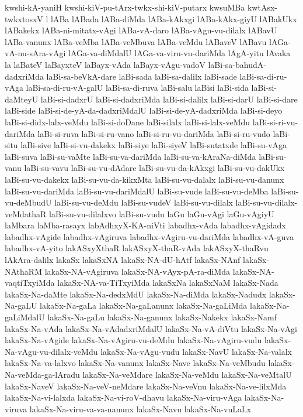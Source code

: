 {kwshi-kA-yaniH
kwshi-kiV-pu-tArx-twkx-shi-kiV-putarx
kwsuMBa
kwtAsx-twkxtosxV
l
lABa
lABada
lABa-diMda
lABa-kAkxgi
lABa-kAkx-giyU
lABakUkx
lABakekx
lABa-ni-mitatx-vAgi
lABa-vA-daro
lABa-vAgu-vu-dilalx
lABavU
lABa-vanunx
lABa-veMba
lABa-veMbuva
lABa-veMdu
lABaveV
lABavu
lAGa-vA-nu-sAra-vAgi
lAGa-va-diMdalU
lAGa-va-viru-vu-dariMda
lAgA-yitu
lAvaka
la
laBateV
laBayxteV
laBayx-vAda
laBayx-vAgu-vadoV
laBi-sa-bahudA-dadxriMda
laBi-sa-beVkA-dare
laBi-sada
laBi-sa-dalilx
laBi-sade
laBi-sa-di-ru-vAga
laBi-sa-di-ru-vA-galU
laBi-sa-di-ruva
laBi-salu
laBisi
laBi-sida
laBi-si-daMteyU
laBi-si-dadxrU
laBi-si-dadxriMda
laBi-si-dalilx
laBi-si-darU
laBi-si-dare
laBi-side
laBi-si-de-yA-da-dadxriMdalU
laBi-si-de-yA-dadxriMda
laBi-si-deyo
laBi-si-didx-lalx-veMdu
laBi-si-doDane
laBi-silalx
laBi-si-lalx-veMdu
laBi-si-ri-vu-dariMda
laBi-si-ruva
laBi-si-ru-vano
laBi-si-ru-vu-dariMda
laBi-si-ru-vudo
laBi-situ
laBi-sive
laBi-si-vu-dakekx
laBi-siye
laBi-siyeV
laBi-sutatxde
laBi-su-vAga
laBi-suva
laBi-su-vaMte
laBi-su-va-dariMda
laBi-su-va-kAraNa-diMda
laBi-su-vanu
laBi-su-vavu
laBi-su-vu-dAdare
laBi-su-vu-da-kAkxgi
laBi-su-vu-dakUkx
laBi-su-vu-dakekx
laBi-su-vu-da-kikxMta
laBi-su-vu-dalalx
laBi-su-vu-danunx
laBi-su-vu-dariMda
laBi-su-vu-dariMdalU
laBi-su-vude
laBi-su-vu-deMba
laBi-su-vu-deMbudU
laBi-su-vu-deMdu
laBi-su-vudeV
laBi-su-vu-dilalx
laBi-su-vu-dilalx-veMdathaR
laBi-su-vu-dilalxvo
laBi-su-vudu
laGu
laGu-vAgi
laGu-vAgiyU
laMbara
laMba-rasayx
labAdhxyX-KA-niVti
labadhx-vAda
labadhx-vAgidadx
labadhx-vAgide
labadhx-vAgiruva
labadhx-vAgiru-vu-dariMda
labadhx-vA-guva
labadhx-vA-yito
lakASxyXthaR
lakASxyX-thaR-vAda
lakASxyX-thaRvu
lAkAra-dalilx
lakaSx
lakaSxNA
lakaSx-NA-dU-hAtf
lakaSx-NAnf
lakaSx-NAthaRM
lakaSx-NA-vAgiruva
lakaSx-NA-vAyx-pA-ra-diMda
lakaSx-NA-vaqtiTxyiMda
lakaSx-NA-va-TiTxyiMda
lakaSxNa
lakaSxNaM
lakaSx-Nada
lakaSx-Na-daMte
lakaSx-Na-dedxMdU
lakaSx-Na-diMda
lakaSx-Nadudx
lakaSx-Na-gaLU
lakaSx-Na-gaLa
lakaSx-Na-gaLanunx
lakaSx-Na-gaLiMda
lakaSx-Na-gaLiMdalU
lakaSx-Na-gaLu
lakaSx-Na-ganunx
lakaSx-Nakekx
lakaSx-Namf
lakaSx-Na-vAda
lakaSx-Na-vAdadxriMdalU
lakaSx-Na-vA-diVtu
lakaSx-Na-vAgi
lakaSx-Na-vAgide
lakaSx-Na-vAgiru-vu-deMdu
lakaSx-Na-vAgiru-vudu
lakaSx-Na-vAgu-vu-dilalx-veMdu
lakaSx-Na-vAgu-vudu
lakaSx-NavU
lakaSx-Na-valalx
lakaSx-Na-va-lalxvo
lakaSx-Na-vanunx
lakaSx-Nave
lakaSx-Na-veMbudu
lakaSx-Na-veMda-ga-lAradu
lakaSx-Na-veMdare
lakaSx-Na-veMdu
lakaSx-Na-veMtalU
lakaSx-NaveV
lakaSx-Na-veV-neMdare
lakaSx-Na-veVnu
lakaSx-Na-ve-lilxMda
lakaSx-Na-vi-lalxda
lakaSx-Na-vi-roV-dhavu
lakaSx-Na-viru-vAga
lakaSx-Na-viruva
lakaSx-Na-viru-va-va-nanunx
lakaSx-Navu
lakaSx-Na-vuLaLx
}
